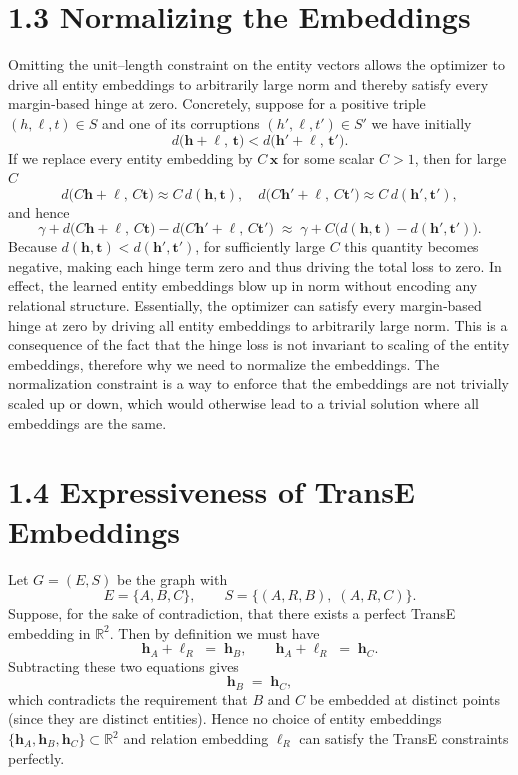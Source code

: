 \documentclass[a4paper,12pt]{article}
\begin{document}
\section*{1.3 Normalizing the Embeddings}

Omitting the unit–length constraint on the entity vectors allows the optimizer to drive all entity embeddings to arbitrarily large norm and thereby satisfy every margin‐based hinge at zero.  Concretely, suppose for a positive triple \((h,\ell,t)\in S\) and one of its corruptions \((h',\ell,t')\in S'\) we have initially
\[
d\bigl(\mathbf{h}+\boldsymbol{\ell},\,\mathbf{t}\bigr)
< 
d\bigl(\mathbf{h}'+\boldsymbol{\ell},\,\mathbf{t}'\bigr).
\]
If we replace every entity embedding by \(C\,\mathbf{x}\) for some scalar \(C>1\), then for large \(C\)
\[
d\bigl(C\mathbf{h}+\boldsymbol{\ell},\,C\mathbf{t}\bigr)
\approx
C\,d(\mathbf{h},\mathbf{t}), 
\quad
d\bigl(C\mathbf{h}'+\boldsymbol{\ell},\,C\mathbf{t}'\bigr)
\approx
C\,d(\mathbf{h}',\mathbf{t}'),
\]
and hence
\[
\gamma
+d\bigl(C\mathbf{h}+\boldsymbol{\ell},\,C\mathbf{t}\bigr)
- d\bigl(C\mathbf{h}'+\boldsymbol{\ell},\,C\mathbf{t}'\bigr)
\;\approx\;
\gamma
+ C\bigl(d(\mathbf{h},\mathbf{t}) - d(\mathbf{h}',\mathbf{t}')\bigr).
\]
Because \(d(\mathbf{h},\mathbf{t})<d(\mathbf{h}',\mathbf{t}')\), for sufficiently large \(C\) this quantity becomes negative, making each hinge term zero and thus driving the total loss to zero.  In effect, the learned entity embeddings blow up in norm without encoding any relational structure. Essentially, the optimizer can satisfy every margin‐based hinge at zero by driving all entity embeddings to arbitrarily large norm.  This is a consequence of the fact that the hinge loss is not invariant to scaling of the entity embeddings, therefore why we need to normalize the embeddings.  The normalization constraint is a way to enforce that the embeddings are not trivially scaled up or down, which would otherwise lead to a trivial solution where all embeddings are the same. 


\section*{1.4 Expressiveness of TransE Embeddings}

Let \(G=(E,S)\) be the graph with
\[
E=\{A,B,C\}, 
\qquad
S=\{(A,R,B),\;(A,R,C)\}.
\]
Suppose, for the sake of contradiction, that there exists a perfect TransE embedding in \(\mathbb R^2\).  Then by definition we must have
\[
\mathbf{h}_A + \boldsymbol{\ell}_R \;=\;\mathbf{h}_B,
\qquad
\mathbf{h}_A + \boldsymbol{\ell}_R \;=\;\mathbf{h}_C.
\]
Subtracting these two equations gives
\[
\mathbf{h}_B \;=\;\mathbf{h}_C,
\]
which contradicts the requirement that \(B\) and \(C\) be embedded at distinct points (since they are distinct entities).  Hence no choice of entity embeddings \(\{\mathbf{h}_A,\mathbf{h}_B,\mathbf{h}_C\}\subset\mathbb R^2\) and relation embedding \(\boldsymbol{\ell}_R\) can satisfy the TransE constraints perfectly.
\end{document}
